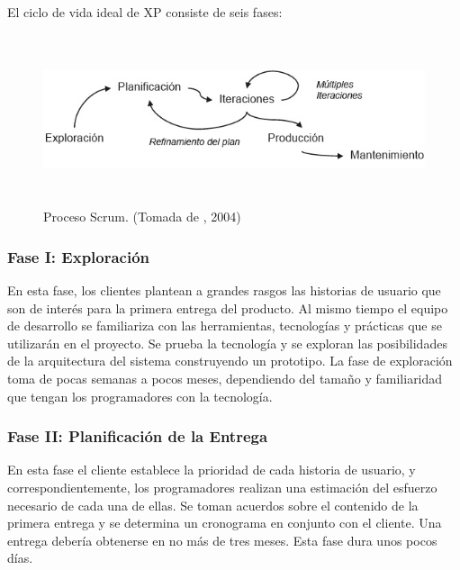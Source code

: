 El ciclo de vida ideal de XP consiste de seis fases: %
\setlength{\parskip}{0mm}

\begin{figure}[H]
\begin{center}
	\includegraphics[width=\textwidth,height=5cm]{img/xp.png}
\end{center}
\caption{Proceso Scrum. (Tomada de \citet{xpibib}, 2004)}
\label{fig:xp}
\end{figure}

\subsubsection{Fase I: Exploración}	
\setlength{\parskip}{5mm}

	En esta fase, los clientes plantean a grandes rasgos las historias de usuario que son de interés para la primera entrega del producto. Al mismo tiempo el equipo de desarrollo se familiariza con las herramientas, tecnologías y prácticas que se utilizarán en el proyecto. Se prueba la tecnología y se exploran las posibilidades de la arquitectura del sistema construyendo un prototipo. La fase de exploración toma de pocas semanas a pocos meses, dependiendo del tamaño y familiaridad que tengan los programadores con la tecnología.

\setlength{\parskip}{0mm}

\subsubsection{Fase II: Planificación de la Entrega}
\setlength{\parskip}{5mm}

	En esta fase el cliente establece la prioridad de cada historia de usuario, y correspondientemente, los programadores realizan una estimación del esfuerzo necesario de cada una de ellas. Se toman acuerdos sobre el contenido de la primera entrega y se determina un cronograma en conjunto con el cliente. Una entrega debería obtenerse en no más de tres meses. Esta fase dura unos pocos días.

